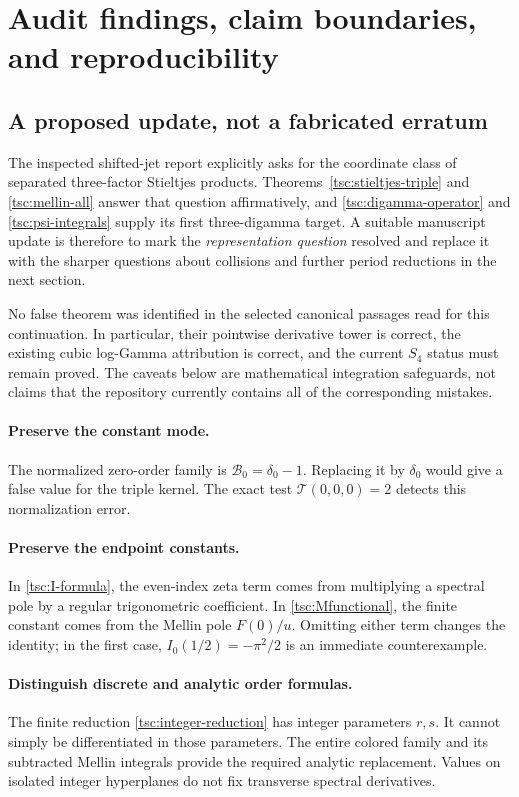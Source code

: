 \documentclass[11pt]{article}
\numberwithin{equation}{section}
\theoremstyle{definition}\newtheorem{definition}[theorem]{Definition}
\theoremstyle{remark}\newtheorem{remark}[theorem]{Remark}
\newcommand{\calB}{\mathcal B}
\newcommand{\calT}{\mathcal T}
\begin{document}
\section{Audit findings, claim boundaries, and reproducibility}\label{tsc:audit}
\subsection{A proposed update, not a fabricated erratum}
The inspected shifted-jet report explicitly asks for the coordinate class
of separated three-factor Stieltjes products. Theorems~\ref{tsc:stieltjes-triple}
and \ref{tsc:mellin-all} answer that question affirmatively, and
\eqref{tsc:digamma-operator} and \eqref{tsc:psi-integrals} supply its first
three-digamma target. A suitable manuscript update is therefore to mark the
\emph{representation question} resolved and replace it with the sharper
questions about collisions and further period reductions in the next
section.

No false theorem was identified in the selected canonical passages read
for this continuation. In particular, their pointwise derivative tower is
correct, the existing cubic log-Gamma attribution is correct, and the
current $S_4$ status must remain proved. The caveats below are mathematical
integration safeguards, not claims that the repository currently contains
all of the corresponding mistakes.

\paragraph{Preserve the constant mode.}
The normalized zero-order family is $\calB_0=\delta_0-1$. Replacing it by
$\delta_0$ would give a false value for the triple kernel. The exact test
$\calT(0,0,0)=2$ detects this normalization error.

\paragraph{Preserve the endpoint constants.}
In \eqref{tsc:I-formula}, the even-index zeta term comes from multiplying a
spectral pole by a regular trigonometric coefficient. In
\eqref{tsc:Mfunctional}, the finite constant comes from the Mellin pole
$F(0)/u$. Omitting either term changes the identity; in the first case,
$I_0(1/2)=-\pi^2/2$ is an immediate counterexample.

\paragraph{Distinguish discrete and analytic order formulas.}
The finite reduction \eqref{tsc:integer-reduction} has integer parameters
$r,s$. It cannot simply be differentiated in those parameters. The entire
colored family and its subtracted Mellin integrals provide the required
analytic replacement. Values on isolated integer hyperplanes do not fix
transverse spectral derivatives.
\end{document}
